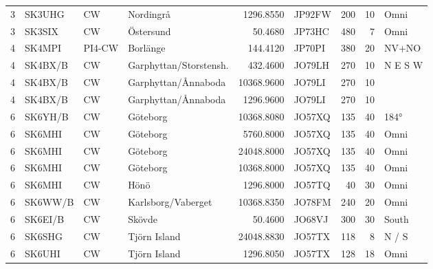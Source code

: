 \begin{landscape}
\begin{longtable}{rlllrlrrl}
	                 3 & SK3UHG     & CW      & Nordingrå              &    1296.8550 & JP92FW      &      200 &       10 & Omni         \\
	                 3 & SK3SIX     & CW      & Östersund              &      50.4680 & JP73HC      &      480 &        7 & Omni         \\
	                 4 & SK4MPI     & PI4-CW  & Borlänge               &     144.4120 & JP70PI      &      380 &       20 & NV+NO        \\
	                 4 & SK4BX/B    & CW      & Garphyttan/Storstensh. &     432.4600 & JO79LH      &      270 &       10 & N E S W      \\
	                 4 & SK4BX/B    & CW      & Garphyttan/Ånnaboda    &   10368.9600 & JO79LI      &      270 &       10 &              \\
	                 4 & SK4BX/B    & CW      & Garphyttan/Ånnaboda    &    1296.9600 & JO79LI      &      270 &       10 &              \\
	                 6 & SK6YH/B    & CW      & Göteborg               &   10368.8080 & JO57XQ      &      135 &       40 & 184°         \\
	                 6 & SK6MHI     & CW      & Göteborg               &    5760.8000 & JO57XQ      &      135 &       40 & Omni         \\
	                 6 & SK6MHI     & CW      & Göteborg               &   24048.8000 & JO57XQ      &      135 &       40 & Omni         \\
	                 6 & SK6MHI     & CW      & Göteborg               &   10368.8000 & JO57XQ      &      135 &       40 & Omni         \\
	                 6 & SK6MHI     & CW      & Hönö                   &    1296.8000 & JO57TQ      &       40 &       30 & Omni         \\
	                 6 & SK6WW/B    & CW      & Karlsborg/Vaberget     &   10368.8350 & JO78FM      &      240 &       20 & Omni         \\
	                 6 & SK6EI/B    & CW      & Skövde                 &      50.4600 & JO68VJ      &      300 &       30 & South        \\
	                 6 & SK6SHG     & CW      & Tjörn Island           &   24048.8830 & JO57TX      &      118 &        8 & N / S        \\
	                 6 & SK6UHI     & CW      & Tjörn Island           &    1296.8050 & JO57TX      &      128 &       18 & Omni         \\

\end{longtable}
\end{landscape}
